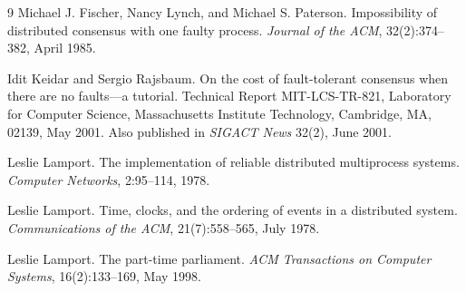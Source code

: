 \begin{thebibliography}{9}
Michael J. Fischer, Nancy Lynch, and Michael S. Paterson.
\newblock Impossibility of distributed consensus with one faulty process.
\newblock \emph{Journal of the ACM}, 32(2):374--382, April 1985.

Idit Keidar and Sergio Rajsbaum.
\newblock On the cost of fault-tolerant consensus when there are no faults---a tutorial.
\newblock Technical Report MIT-LCS-TR-821, Laboratory for Computer Science, Massachusetts Institute Technology, Cambridge, MA, 02139, May 2001. Also published in \emph{SIGACT News} 32(2), June 2001.

Leslie Lamport.
\newblock The implementation of reliable distributed multiprocess systems.
\newblock \emph{Computer Networks}, 2:95--114, 1978.

Leslie Lamport.
\newblock Time, clocks, and the ordering of events in a distributed system.
\newblock \emph{Communications of the ACM}, 21(7):558--565, July 1978.

Leslie Lamport.
\newblock The part-time parliament.
\newblock \emph{ACM Transactions on Computer Systems}, 16(2):133--169, May 1998.
\end{thebibliography}

